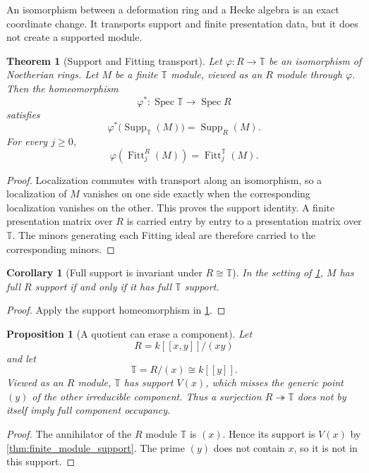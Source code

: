 \documentclass{aomart}
\newtheorem{theorem}{Theorem}[section]
\newtheorem{proposition}[proposition]{Proposition}
\newtheorem{corollary}[corollary]{Corollary}
\theoremstyle{definition}
\theoremstyle{remark}
\newcommand{\TT}{\mathbb T}
\newcommand{\Spec}{\operatorname{Spec}}
\newcommand{\Supp}{\operatorname{Supp}}
\newcommand{\Fitt}{\operatorname{Fitt}}
\begin{document}
An isomorphism between a deformation ring and a Hecke algebra is an exact coordinate change. It transports support and finite presentation data, but it does not create a supported module.

\begin{theorem}[Support and Fitting transport]\label{thm:rt_support_transport}
Let \(\varphi:R\to\TT\) be an isomorphism of Noetherian rings. Let \(M\) be a finite \(\TT\) module, viewed as an \(R\) module through \(\varphi\). Then the homeomorphism
\[
\varphi^*:\Spec\TT\longrightarrow\Spec R
\]
satisfies
\[
\boxed{
\varphi^*\bigl(\Supp_{\TT}(M)\bigr)
=
\Supp_R(M).
}
\]
For every \(j\geq0\),
\[
\boxed{
\varphi
\left(
\Fitt_j^R(M)
\right)
=
\Fitt_j^{\TT}(M).
}
\]
\end{theorem}

\begin{proof}
Localization commutes with transport along an isomorphism, so a localization of \(M\) vanishes on one side exactly when the corresponding localization vanishes on the other. This proves the support identity. A finite presentation matrix over \(R\) is carried entry by entry to a presentation matrix over \(\TT\). The minors generating each Fitting ideal are therefore carried to the corresponding minors.
\end{proof}

\begin{corollary}[Full support is invariant under \texorpdfstring{\(R\cong\TT\)}{R equals T}]\label{cor:rt_full_support}
In the setting of \cref{thm:rt_support_transport}, \(M\) has full \(R\) support if and only if it has full \(\TT\) support.
\end{corollary}

\begin{proof}
Apply the support homeomorphism in \cref{thm:rt_support_transport}.
\end{proof}

\begin{proposition}[A quotient can erase a component]\label{prop:quotient_erases_component}
Let
\[
R=k[[x,y]]/(xy)
\]
and let
\[
\TT=R/(x)\cong k[[y]].
\]
Viewed as an \(R\) module, \(\TT\) has support \(V(x)\), which misses the generic point \((y)\) of the other irreducible component. Thus a surjection \(R\twoheadrightarrow\TT\) does not by itself imply full component occupancy.
\end{proposition}

\begin{proof}
The annihilator of the \(R\) module \(\TT\) is \((x)\). Hence its support is \(V(x)\) by \cref{thm:finite_module_support}. The prime \((y)\) does not contain \(x\), so it is not in this support.
\end{proof}
\end{document}
